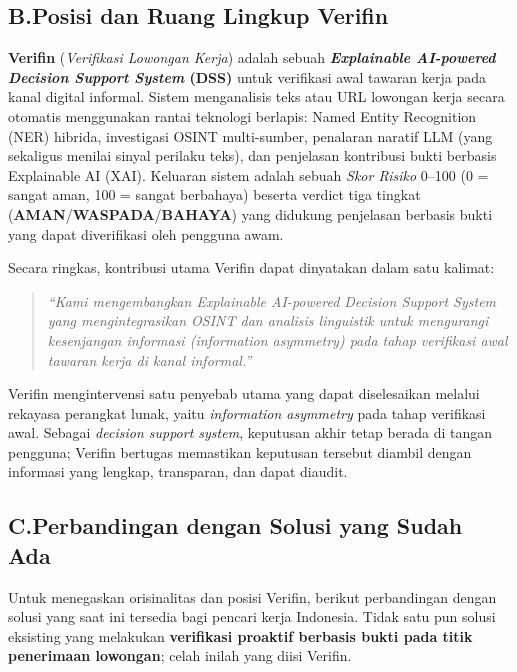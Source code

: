 \documentclass[12pt,a4paper]{article}
\begin{document}
\subsection*{B.\quad Posisi dan Ruang Lingkup Verifin}

\textbf{Verifin} (\textit{Verifikasi Lowongan Kerja}) adalah sebuah \textbf{\textit{Explainable
AI-powered Decision Support System} (DSS)} untuk verifikasi awal tawaran kerja pada kanal digital
informal. Sistem menganalisis teks atau URL lowongan kerja secara otomatis menggunakan rantai
teknologi berlapis: Named Entity Recognition (NER) hibrida, investigasi
OSINT multi-sumber, penalaran naratif LLM (yang sekaligus menilai sinyal perilaku teks), dan
penjelasan kontribusi bukti berbasis Explainable
AI (XAI).
Keluaran sistem adalah sebuah \textit{Skor Risiko} 0--100 (0 = sangat aman, 100 = sangat berbahaya)
beserta verdict tiga tingkat (\textbf{AMAN}/\textbf{WASPADA}/\textbf{BAHAYA}) yang didukung penjelasan berbasis bukti yang
dapat diverifikasi oleh pengguna awam.

Secara ringkas, kontribusi utama Verifin dapat dinyatakan dalam satu kalimat:

\begin{quote}
\itshape ``Kami mengembangkan \textit{Explainable AI-powered Decision Support System} yang
mengintegrasikan OSINT dan analisis linguistik untuk mengurangi kesenjangan informasi
(\textit{information asymmetry}) pada tahap verifikasi awal tawaran kerja di kanal informal.''
\end{quote}

Verifin mengintervensi satu penyebab utama yang dapat diselesaikan melalui
rekayasa perangkat lunak, yaitu \textit{information asymmetry} pada tahap verifikasi awal. Sebagai
\textit{decision support system}, keputusan akhir tetap berada di tangan pengguna; Verifin
bertugas memastikan keputusan tersebut diambil dengan informasi yang lengkap, transparan, dan
dapat diaudit.

\subsection*{C.\quad Perbandingan dengan Solusi yang Sudah Ada}

Untuk menegaskan orisinalitas dan posisi Verifin, berikut perbandingan dengan solusi yang saat ini
tersedia bagi pencari kerja Indonesia. Tidak satu pun solusi eksisting yang melakukan
\textbf{verifikasi proaktif berbasis bukti pada titik penerimaan lowongan}; celah inilah yang diisi
Verifin.
\end{document}
